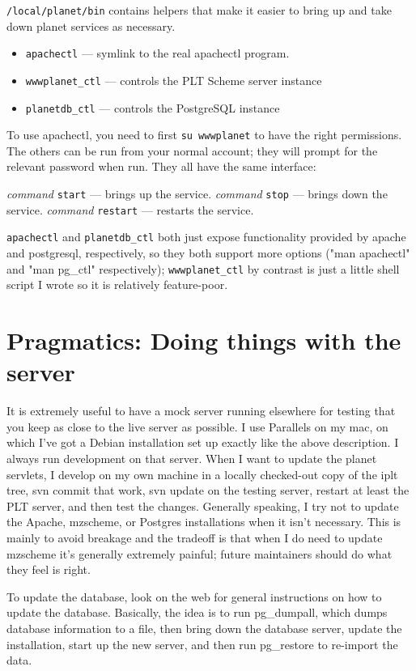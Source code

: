 \documentclass{article}
\begin{document}
\texttt{/local/planet/bin} contains helpers that make it easier to bring up
and take down planet services as necessary.

\begin{itemize}
\item \texttt{apachectl} --- symlink to the real apachectl program. 
\item \texttt{wwwplanet\_ctl} --- controls the PLT Scheme server instance
\item \texttt{planetdb\_ctl} --- controls the PostgreSQL instance
\end{itemize}

To use apachectl, you need to first \texttt{su wwwplanet} to have the right
permissions. The others can be run from your normal account; they will
prompt for the relevant password when run. They all have the same
interface:

\textit{command} \texttt{start}  --- brings up the service.
\textit{command} \texttt{stop} --- brings down the service.
\textit{command} \texttt{restart} --- restarts the service.

\texttt{apachectl} and \texttt{planetdb\_ctl} both just expose
functionality provided by apache and postgresql, respectively, so they
both support more options ("man apachectl" and "man pg\_ctl"
respectively); \texttt{wwwplanet\_ctl} by contrast is just a little shell script
I wrote so it is relatively feature-poor.

\section{Pragmatics: Doing things with the server}

It is extremely useful to have a mock server running elsewhere for
testing that you keep as close to the live server as possible. I use
Parallels on my mac, on which I've got a Debian installation set up
exactly like the above description. I always run development on that
server. When I want to update the planet servlets, I develop on my own
machine in a locally checked-out copy of the iplt tree, svn commit
that work, svn update on the testing server, restart at least the PLT
server, and then test the changes. Generally speaking, I try not to
update the Apache, mzscheme, or Postgres installations when it isn't
necessary. This is mainly to avoid breakage and the tradeoff is that
when I do need to update mzscheme it's generally extremely painful;
future maintainers should do what they feel is right.

To update the database, look on the web for general instructions on
how to update the database. Basically, the idea is to run pg\_dumpall,
which dumps database information to a file, then bring down the
database server, update the installation, start up the new server, and
then run pg\_restore to re-import the data.
\end{document}

